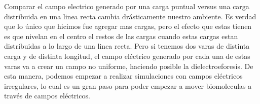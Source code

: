 
\tab Comparar el campo electrico generado por una carga puntual versus una carga distribuida en una linea recta cambia drásticamente nuestro ambiente. Es verdad que lo único que hicimos fue agregar mas cargas, pero el efecto que estas tienen es que nivelan en el centro el restos de las cargas cuando estas cargas estan distribuidas a lo largo de una linea recta. Pero si tenemos dos varas de distinta carga y de distinta longitud, el campo eléctrico generado por cada una de estas varas va a crear un campo no uniforme, haciendo posible la dielectroeforesis. De esta manera, podemos empezar a realizar simulaciones con campos eléctricos irregulares, lo cual es un gran paso para poder empezar a mover biomoleculas a través de campos eléctricos.